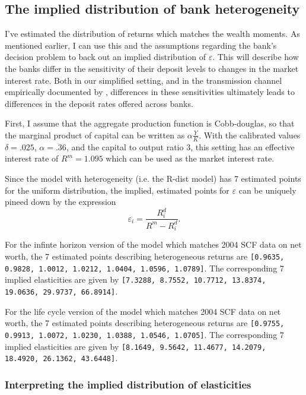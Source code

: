  \subsection{The implied distribution of bank heterogeneity}

  \par I've estimated the distribution of returns which matches the wealth moments. As mentioned earlier, I can use this and the assumptions regarding the bank's decision problem to back out an implied distribution of $\varepsilon$. This will describe how the banks differ in the sensitivity of their deposit levels to changes in the market interest rate. Both in our simplified setting, and in the transmission channel empirically documented by \cite{Drechsler2017}, differences in these sensitivities ultimately leads to differences in the deposit rates offered across banks.  

  \par First, I assume that the aggregate production function is Cobb-douglas, so that the marginal product of capital can be written as $\alpha \frac{Y}{K}$. With the calibrated values  $\delta = .025$, $\alpha = .36$, and the capital to output ratio $3$, this setting has an effective interest rate of $R^m = 1.095$ which can be used as the market interest rate.

  \par Since the model with heterogeneity (i.e. the R-dist model) has 7 estimated points for the uniform distribution, the implied, estimated points for $\varepsilon$ can be uniquely pineed down by the expression $$\varepsilon_i = \frac{R_i^d}{R^m - R_i^d} .$$

  \par For the infinte horizon version of the model which matches 2004 SCF data on net worth, the 7 estimated points describing heterogeneous returns are \texttt{[0.9635, 0.9828, 1.0012, 1.0212, 1.0404, 1.0596, 1.0789]}. The corresponding 7 implied elasticities are given by \texttt{[7.3288, 8.7552, 10.7712, 13.8374, 19.0636, 29.9737, 66.8914]}.

  \par For the life cycle version of the model which matches 2004 SCF data on net worth, the 7 estimated points describing heterogeneous returns are \texttt{[0.9755, 0.9913, 1.0072, 1.0230, 1.0388, 1.0546, 1.0705]}. The corresponding 7 implied elasticities are given by \texttt{[8.1649, 9.5642, 11.4677, 14.2079, 18.4920, 26.1362, 43.6448]}.


  \subsubsection{Interpreting the implied distribution of elasticities}

